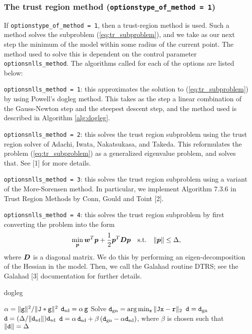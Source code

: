 \subsubsection{The trust region method ({\tt options\ct type\_of\_method = 1})}
\label{sec:trust-region}

If {\tt options\ct type\_of\_method = 1}, then a trust-region method is used.  Such a method solves the subproblem (\ref{eq:tr_subproblem}), and we take as our next step
the minimum of the model within some radius of the current point.  The method used to solve
this is dependent on the control parameter {\tt options\ct nlls\_method}. The algorithms called for each of the options are listed below:
\begin{description}
\item {\tt options\ct nlls\_method = 1}: this approximates the solution to (\ref{eq:tr_subproblem}) by using Powell's dogleg method.  This takes as the step a linear combination of the Gauss-Newton step and the steepest descent step, and the method used is described in Algorithm \ref{alg:dogleg}.
\item {\tt options\ct nlls\_method = 2}: this solves the trust region subproblem using the trust region solver of  Adachi, Iwata, Nakatsukasa, and Takeda.  This reformulates the 
problem (\ref{eq:tr_subproblem}) as a generalized eigenvalue problem, and solves that.  See
[1] for more details.
\item {\tt options\ct nlls\_method = 3}: this solves the trust region subproblem using 
a variant of the More-Sorensen method.  In particular, we implement Algorithm 7.3.6
 in Trust Region Methods by Conn, Gould and Toint [2].
\item {\tt options\ct nlls\_method = 4}: this solves the trust region subproblem by first 
converting the problem into the form
$$\min_{\bm p} {\bm w}^T {\bm p} + \frac{1}{2} {\bm p}^T {\bm D} {\bm p} \quad {\rm s.t.} \quad \|{\bm p}\| \leq \Delta,$$
where ${\bm D}$ is a diagonal matrix.  We do this by performing an eigen-decomposition of 
the Hessian in the model.  Then, we call the {\sc Galahad} routine {\sc DTRS}; see 
the {\sc Galahad} [3] documentation for further details.
\end{description}

\begin{algorithm}
\caption{dogleg}
\label{alg:dogleg}
  \begin{algorithmic}[1]
     
        \State $\alpha = \|{\tt g}\|^2 / \|{\tt J} * {\tt g}\|^2$
        \State ${\tt d}_{\rm sd} = \alpha \,{\tt g}$
        \State Solve ${\tt d}_{\rm gn} = \arg \min_{{\tt x}}\|{\tt J} {\tt x}- {\tt r}\|_2$
        \State ${\tt d} = {\tt d}_{\rm gn}$
        \State ${\tt d} = (\Delta / \|{\tt d}_{\rm sd}\|) {\tt d}_{\rm sd}$
        \Else
        \State ${\tt d} = \alpha \, {\tt d}_{\rm sd} + \beta\, ({\tt d}_{\rm gn} - \alpha {\tt d}_{\rm sd})$, where $\beta$ is chosen such that $\|{\tt d}\| = \Delta$
        \EndIf
  \end{algorithmic}
\end{algorithm}
 

